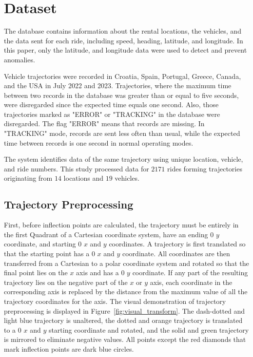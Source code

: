 \documentclass[preprint,12pt]{elsarticle}
\begin{document}
\section{Dataset}
\label{sec:Dataset}

The database \cite{ototrakOtoTrakTrack} contains information about the rental locations, the vehicles, and the data sent for each ride, including speed, heading, latitude, and longitude. In this paper, only the latitude, and longitude data were used to detect and prevent anomalies.

Vehicle trajectories were recorded in Croatia, Spain, Portugal, Greece, Canada, and the USA in July 2022 and 2023. Trajectories, where the maximum time between two records in the database was greater than or equal to five seconds, were disregarded since the expected time equals one second. Also, those trajectories marked as "ERROR" or "TRACKING" in the database were disregarded. The flag "ERROR" means that records are missing. In "TRACKING" mode, records are sent less often than usual, while the expected time between records is one second in normal operating modes.

The system \cite{ototrakOtoTrakTrack} identifies data of the same trajectory using unique location, vehicle, and ride numbers. This study processed data for $2171$ rides forming trajectories originating from $14$ locations and $19$ vehicles.

\subsection{Trajectory Preprocessing}

First, before inflection points are calculated, the trajectory must be entirely in the first Quadrant of a Cartesian coordinate system, have an ending $0$ $y$ coordinate, and starting $0$ $x$ and $y$ coordinates. A trajectory is first translated so that the starting point has a $0$ $x$ and $y$ coordinate. All coordinates are then transferred from a Cartesian to a polar coordinate system and rotated so that the final point lies on the $x$ axis and has a $0$ $y$ coordinate. If any part of the resulting trajectory lies on the negative part of the $x$ or $y$ axis, each coordinate in the corresponding axis is replaced by the distance from the maximum value of all the trajectory coordinates for the axis. The visual demonstration of trajectory preprocessing is displayed in Figure~\ref{fig:visual_transform}. The dash-dotted and light blue trajectory is unaltered, the dotted and orange trajectory is translated to a $0$ $x$ and $y$ starting coordinate and rotated, and the solid and green trajectory is mirrored to eliminate negative values. All points except the red diamonds that mark inflection points are dark blue circles.
\end{document}
